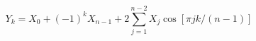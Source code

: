 \documentclass[a4paper, 12pt]{article}
\begin{document}
\begin{equation*}
Y_k = X_0 + (-1)^k X_{n-1} + 2 \sum\limits_{j=1}^{n-2} X_j \cos\left[ \pi j k / (n-1) \right]
\end{equation*}
\end{document}
